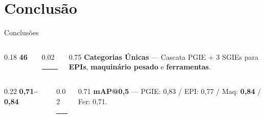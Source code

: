 
\section{Conclusão}

\begin{frame}{Conclusões}
  \vfill

  \begin{columns}[c]
    \begin{column}{0.18\textwidth}
      \raggedleft
      {\fontsize{26}{28}\selectfont\textcolor{headcolor}{\textbf{46}}}
    \end{column}
    \begin{column}{0.02\textwidth}
      \centering
      \textcolor{arrowcolor}{\rule{0.4pt}{1.5em}}
    \end{column}
    \begin{column}{0.75\textwidth}
      {\small\textbf{Categorias Únicas} --- Cascata PGIE + 3 SGIEs para\\
      \textbf{EPIs}, \textbf{maquinário pesado} e \textbf{ferramentas}.}
    \end{column}
  \end{columns}

  \vspace{3mm}

  \begin{columns}[c]
    \begin{column}{0.22\textwidth}
      \raggedleft
      {\fontsize{14}{16}\selectfont\textcolor{inputcolor}{\textbf{\mbox{0,71--0,84}}}}
    \end{column}
    \begin{column}{0.02\textwidth}
      \centering
      \textcolor{arrowcolor}{\rule{0.4pt}{1.5em}}
    \end{column}
    \begin{column}{0.71\textwidth}
      {\small\textbf{mAP@0,5} --- PGIE: 0,83 / EPI: 0,77 / Maq: \textbf{0,84} / Fer: 0,71.}
    \end{column}
  \end{columns}

  \vspace{3mm}


\end{frame}
